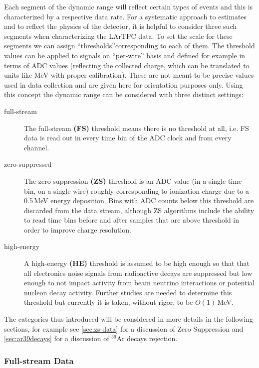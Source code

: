 Each segment of the dynamic range will reflect certain types of events and this
is characterized by a respective data rate. For a systematic approach to estimates
and to reflect the physics of the detector, it is helpful to consider three such segments when characterizing the LArTPC data.
To set the scale for these segments we can assign ``thresholds''corresponding to each of them.
The threshold values can be applied to signals on ``per-wire'' basis and defined for example
in terms of ADC values (reflecting the collected charge, which can be translated to units like MeV with proper calibration).
These are not meant to be precise values used in data collection and are given here for orientation purposes only.
Using this concept the dynamic range can be considered with three distinct settings:
\begin{description}
	
\item[full-stream] The full-stream \textbf{(FS)} threshold means there is no threshold at all, i.e.
FS data is read out in every time bin of the ADC clock and from every channel.

\item[zero-suppressed] The zero-suppression \textbf{(ZS)} threshold is an ADC value (in a single time bin,
on a single wire) roughly corresponding to ionization charge due to a 0.5\,MeV energy deposition.
Bins with ADC counts below this threshold are discarded from the data stream, although ZS algorithms include
the ability to read time bins before and after samples that are above threshold in order to improve charge resolution.

\item[high-energy] A high-energy \textbf{(HE)} threshold is assumed to be high enough so that
  that all electronics noise signals from radioactive decays are suppressed but low
  enough to not impact activity from beam neutrino interactions or potential nucleon decay activity.
  Further studies are needed to determine this threshold but currently
  it is taken, without rigor, to be $O(1)$\,MeV.

\end{description}

The categories thus introduced will be considered in more details in the following sections, for example
see \ref{sec:zs-data} for a discussion of Zero Suppression and \ref{sec:ar39decays} for a discussion of
$^{39}$Ar decays rejection.


\subsubsection{Full-stream Data}


